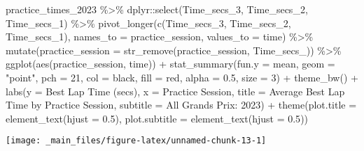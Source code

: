 \documentclass[
]{book}
\newenvironment{Shaded}{\begin{snugshade}}{\end{snugshade}}
\newcommand{\AttributeTok}[1]{\textcolor[rgb]{0.77,0.63,0.00}{#1}}
\newcommand{\DecValTok}[1]{\textcolor[rgb]{0.00,0.00,0.81}{#1}}
\newcommand{\FloatTok}[1]{\textcolor[rgb]{0.00,0.00,0.81}{#1}}
\newcommand{\FunctionTok}[1]{\textcolor[rgb]{0.00,0.00,0.00}{#1}}
\newcommand{\NormalTok}[1]{#1}
\newcommand{\SpecialCharTok}[1]{\textcolor[rgb]{0.00,0.00,0.00}{#1}}
\newcommand{\StringTok}[1]{\textcolor[rgb]{0.31,0.60,0.02}{#1}}
\begin{document}
\begin{Shaded}
\begin{Highlighting}[]
\NormalTok{practice\_times\_2023 }\SpecialCharTok{\%\textgreater{}\%}
\NormalTok{  dplyr}\SpecialCharTok{::}\FunctionTok{select}\NormalTok{(Time\_secs\_3, Time\_secs\_2, Time\_secs\_1) }\SpecialCharTok{\%\textgreater{}\%}
  \FunctionTok{pivot\_longer}\NormalTok{(}\FunctionTok{c}\NormalTok{(Time\_secs\_3, Time\_secs\_2, Time\_secs\_1), }\AttributeTok{names\_to =} \StringTok{\textquotesingle{}practice\_session\textquotesingle{}}\NormalTok{, }\AttributeTok{values\_to =} \StringTok{\textquotesingle{}time\textquotesingle{}}\NormalTok{) }\SpecialCharTok{\%\textgreater{}\%}
  \FunctionTok{mutate}\NormalTok{(}\AttributeTok{practice\_session =} \FunctionTok{str\_remove}\NormalTok{(practice\_session, }\StringTok{\textquotesingle{}Time\_secs\_\textquotesingle{}}\NormalTok{)) }\SpecialCharTok{\%\textgreater{}\%}
  \FunctionTok{ggplot}\NormalTok{(}\FunctionTok{aes}\NormalTok{(practice\_session, time)) }\SpecialCharTok{+}
  \FunctionTok{stat\_summary}\NormalTok{(}\AttributeTok{fun.y =}\NormalTok{ mean, }
               \AttributeTok{geom =} \StringTok{"point"}\NormalTok{, }\AttributeTok{pch =} \DecValTok{21}\NormalTok{, }\AttributeTok{col =} \StringTok{\textquotesingle{}black\textquotesingle{}}\NormalTok{, }\AttributeTok{fill =}  \StringTok{\textquotesingle{}red\textquotesingle{}}\NormalTok{, }\AttributeTok{alpha =} \FloatTok{0.5}\NormalTok{, }\AttributeTok{size =} \DecValTok{3}\NormalTok{) }\SpecialCharTok{+} 
  \FunctionTok{theme\_bw}\NormalTok{() }\SpecialCharTok{+}
  \FunctionTok{labs}\NormalTok{(}\AttributeTok{y =} \StringTok{\textquotesingle{}Best Lap Time (secs)\textquotesingle{}}\NormalTok{,}
       \AttributeTok{x =} \StringTok{\textquotesingle{}Practice Session\textquotesingle{}}\NormalTok{,}
       \AttributeTok{title =} \StringTok{\textquotesingle{}Average Best Lap Time by Practice Session\textquotesingle{}}\NormalTok{,}
       \AttributeTok{subtitle =} \StringTok{\textquotesingle{}All Grands Prix: 2023\textquotesingle{}}\NormalTok{) }\SpecialCharTok{+}
  \FunctionTok{theme}\NormalTok{(}\AttributeTok{plot.title =} \FunctionTok{element\_text}\NormalTok{(}\AttributeTok{hjust =} \FloatTok{0.5}\NormalTok{),}
        \AttributeTok{plot.subtitle =} \FunctionTok{element\_text}\NormalTok{(}\AttributeTok{hjust =} \FloatTok{0.5}\NormalTok{))}
\end{Highlighting}
\end{Shaded}

\begin{center}\texttt{[image: \_main\_files/figure-latex/unnamed-chunk-13-1]} \end{center}
\end{document}
